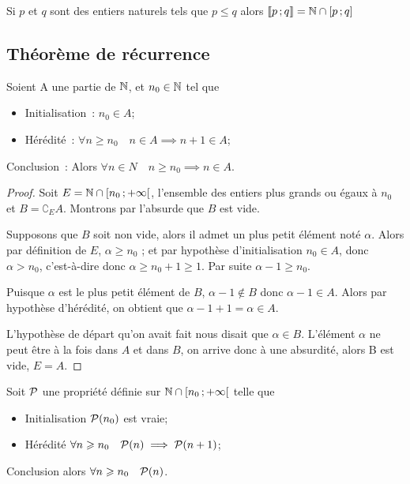  Si $p$ et $q$ sont des entiers naturels tels que $p\leqslant q$ alors $\intervalleentier{p}{q}= \N\cap\intervalleff{p}{q}$ 

\subsection{Théorème de récurrence}

\begin{theo}
  \label{theo:rec}
  Soient A une partie de $\N$, et $n_0\in\N$ tel que
  \begin{itemize}
  \item Initialisation~: $n_0\in A$;
  \item Hérédité~: $\forall n\geqslant n_0 \quad n\in A \implies n+1\in A$;
  \end{itemize}
  Conclusion~: Alors $\forall n \in N \quad n\geqslant n_0 \implies n \in A$.
\end{theo}
\begin{proof}
  Soit $E=\N\cap \intervallefo{n_0}{+\infty}$, l'ensemble des entiers plus grands ou égaux à $n_0$ et $B=\complement_E A$. Montrons par l'absurde que $B$ est vide. 

Supposons que $B$ soit non vide, alors il admet un plus petit élément noté $\alpha$. Alors par définition de $E$, $\alpha\geqslant n_0$ ; et par hypothèse d'initialisation $n_0\in A$, donc $\alpha > n_0$, c'est-à-dire donc $\alpha\geqslant n_0+1\geqslant 1$. Par suite $\alpha-1\geqslant n_0$. 

Puisque $\alpha$ est le plus petit élément de $B$, $\alpha-1 \notin B$ donc $\alpha-1 \in A$. Alors par hypothèse d'hérédité, on obtient que $\alpha-1+1=\alpha\in A$. 

L'hypothèse de départ qu'on avait fait nous disait que $\alpha \in B$. L'élément $\alpha$ ne peut être à la fois dans $A$ et dans $B$, on arrive donc à une absurdité, alors B est vide, $E=A$.
\end{proof}
\begin{cor}
  \label{cor:recsimple}
  Soit $\P$ une propriété définie sur $\N\cap \intervallefo{n_0}{+\infty}$ telle que
  \begin{itemize}
  \item Initialisation $\P(n_0)$ est vraie;
  \item Hérédité $\forall n\geqslant n_0 \quad \P(n) \implies \P(n+1)$;
  \end{itemize}
  Conclusion alors $\forall n\geqslant n_0 \quad \P(n)$.
\end{cor}
